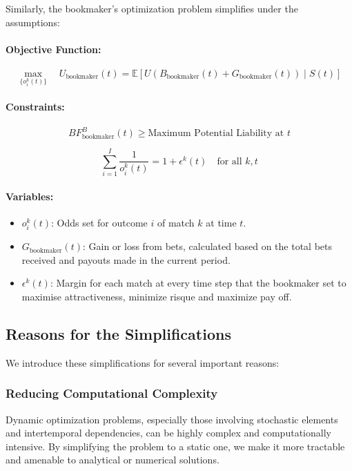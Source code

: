 Similarly, the bookmaker's optimization problem simplifies under the assumptions:

\paragraph{Objective Function:}

\[
\max_{\{ o_i^k(t) \}} \quad U_{\text{bookmaker}}(t) = \mathbb{E} \left[ U\left( B_{\text{bookmaker}}(t) + G_{\text{bookmaker}}(t) \right) \mid S(t) \right]
\]

\paragraph{Constraints:}

   \[
   BF_{\text{bookmaker}}^B(t) \geq \text{Maximum Potential Liability at } t
   \]

    \[
     \sum_{i=1}^{I} \frac{1}{o_i^k(t)} = 1 + \epsilon^k(t) \quad \text{for all } k, t
    \]


\paragraph{Variables:}

\begin{itemize}
    \item \( o_i^k(t) \): Odds set for outcome \( i \) of match \( k \) at time \( t \).
    \item \( G_{\text{bookmaker}}(t) \): Gain or loss from bets, calculated based on the total bets received and payouts made in the current period.
    \item \(\epsilon^k(t)\): Margin for each match at every time step that the bookmaker set to maximise attractiveness, minimize risque and maximize pay off.
\end{itemize}

\subsection{Reasons for the Simplifications}

We introduce these simplifications for several important reasons:

\subsubsection{Reducing Computational Complexity}

Dynamic optimization problems, especially those involving stochastic elements and intertemporal dependencies, can be highly complex and computationally intensive. By simplifying the problem to a static one, we make it more tractable and amenable to analytical or numerical solutions.

